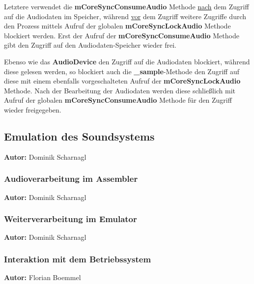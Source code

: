 \documentclass[11pt,a4paper]{scrartcl}
\newcommand{\AutorDominik} {
    \vspace{-4mm}
    \large \textbf{Autor:} Dominik Scharnagl \normalsize
    \vspace{2mm}
}
\newcommand{\AutorFlorian} {
    \vspace{-4mm}
    \large \textbf{Autor:} Florian Boemmel \normalsize
    \vspace{2mm}
}
\begin{document}
Letztere verwendet die \textbf{mCoreSyncConsumeAudio} Methode \underline{nach} dem Zugriff auf die Audiodaten im Speicher, w\"ahrend \underline{vor} dem Zugriff weitere Zugriffe durch den Prozess mittels Aufruf der globalen \textbf{mCoreSyncLockAudio} Methode blockiert werden. Erst der Aufruf der \textbf{mCoreSyncConsumeAudio} Methode gibt den Zugriff auf den Audiodaten-Speicher wieder frei.

Ebenso wie das \textbf{AudioDevice} den Zugriff auf die Audiodaten blockiert, w\"ahrend diese gelesen werden, so blockiert auch die \textbf{{\_}sample}-Methode den Zugriff auf diese mit einem ebenfalls vorgeschalteten Aufruf der \textbf{mCoreSyncLockAudio} Methode. Nach der Bearbeitung der Audiodaten werden diese schlie{\ss}lich mit Aufruf der globalen \textbf{mCoreSyncConsumeAudio} Methode f\"ur den Zugriff wieder freigegeben.

\newpage


\subsection{Emulation des Soundsystems} \label{EmulationSoundsystem}
\AutorDominik


\subsubsection{Audioverarbeitung im Assembler}
\AutorDominik


\subsubsection{Weiterverarbeitung im Emulator}
\AutorDominik


\subsubsection{Interaktion mit dem Betriebssystem}
\AutorFlorian
\end{document}

